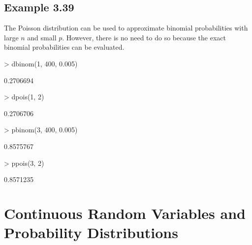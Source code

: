 \documentclass{book}
\begin{document}
\section{Example 3.39}
\label{sec:xmp0339}

The Poisson distribution can be used to approximate binomial
probabilities with large $n$ and small $p$.  However, there is no need
to do so because the exact binomial probabilities can be evaluated.
\begin{Schunk}
\begin{Sinput}
> dbinom(1, 400, 0.005)
\end{Sinput}
\begin{Soutput}
[1] 0.2706694
\end{Soutput}
\begin{Sinput}
> dpois(1, 2)
\end{Sinput}
\begin{Soutput}
[1] 0.2706706
\end{Soutput}
\begin{Sinput}
> pbinom(3, 400, 0.005)
\end{Sinput}
\begin{Soutput}
[1] 0.8575767
\end{Soutput}
\begin{Sinput}
> ppois(3, 2)
\end{Sinput}
\begin{Soutput}
[1] 0.8571235
\end{Soutput}
\end{Schunk}

\chapter[Continuous Random Variables]{Continuous Random Variables and
  Probability Distributions}
\label{cha:Continuous}
\end{document}
